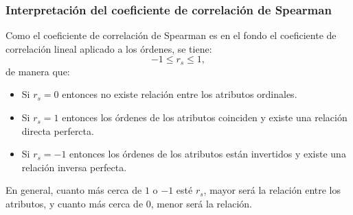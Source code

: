 \begin{frame}
\frametitle{Interpretación del coeficiente de correlación de Spearman}
Como el coeficiente de correlación de Spearman es en el fondo el coeficiente de correlación lineal aplicado a los
órdenes, se tiene:
\[
-1\leq r_s\leq 1,
\]
de manera que:
\begin{itemize}
\item Si $r_s=0$ entonces no existe relación entre los atributos ordinales.
\item Si $r_s=1$ entonces los órdenes de los atributos coinciden y existe una relación directa perfercta.
\item Si $r_s=-1$ entonces los órdenes de los atributos están invertidos y existe una relación inversa perfecta.
\end{itemize}
En general, cuanto más cerca de $1$ o $-1$ esté $r_s$, mayor será la relación entre los atributos, y cuanto más cerca
de $0$, menor será la relación.

\end{frame}


